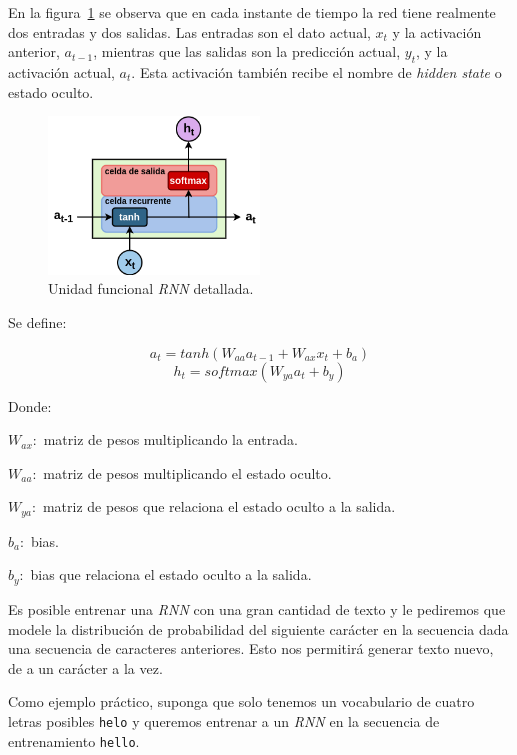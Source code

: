 \documentclass[a4paper,12pt]{article}
\begin{document}
En la figura~\ref{fig:rnnunitv2} se observa que en cada instante de tiempo la red tiene realmente dos entradas y dos salidas. Las entradas son el dato actual, $x_t$ y la activación anterior, $a_{t-1}$, mientras que las salidas son la predicción actual, $y_t$, y la activación actual, $a_t$. Esta activación también recibe el nombre de \textit{hidden state} o estado oculto.

\begin{figure}[H]
	\begin{center}				
		\includegraphics[width=0.5\textwidth]{rnnunitv2.png}
		\caption{Unidad funcional \textit{RNN} detallada. \citep{olahlstm}}
		\label{fig:rnnunitv2}
	\end{center}
\end{figure}

Se define:

$$ a_{t} = tanh(W_{aa}a_{t-1}+W_{ax}x_t+b_a) $$
$$ h_t = softmax(W_{ya}a_t + b_y) $$

Donde:

$ W_{ax}:$ matriz de pesos multiplicando la entrada.

$ W_{aa}:$ matriz de pesos multiplicando el estado oculto.

$ W_{ya}:$ matriz de pesos que relaciona el estado oculto a la salida.

$b_a:$ bias.

$b_y:$ bias que relaciona el estado oculto a la salida.

Es posible entrenar una \textit{RNN} con una gran cantidad de texto y le pediremos que modele la distribución de probabilidad del siguiente carácter en la secuencia dada una secuencia de caracteres anteriores. Esto nos permitirá generar texto nuevo, de a un carácter a la vez.

Como ejemplo práctico, suponga que solo tenemos un vocabulario de cuatro letras posibles \texttt{helo} y queremos entrenar a un \textit{RNN} en la secuencia de entrenamiento \texttt{hello}. 

\clearpage
\end{document}
